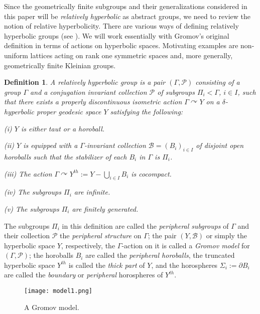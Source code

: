 \documentclass[12pt]{article}
\theoremstyle{boldplain}
\theoremstyle{bolddefinition}
\newtheorem{definition}[equation]{Definition}
\numberwithin{equation}{section}
\def\B{{\mathcal B}}
\def\Ga{\Gamma}
\def\de{\delta}
\def\Si{\Sigma}
\def\acts{\curvearrowright}
\def\D{\partial}
\begin{document}
Since the geometrically finite subgroups and their generalizations considered in this paper 
will be {\em relatively hyperbolic} as abstract groups, we need to review the notion of relative hyperbolicity. 
There are various ways of defining relatively hyperbolic groups 
(see \cite{Osin, Drutu-Sapir, Hruska, Bowditch2012, Farb, Gerasimov-Potyagailo, GerasimovPotyagailo2, Yaman}).
We will work essentially
with Gromov's original definition \cite[\S 8.6]{Gromov}
in terms of actions on hyperbolic spaces.
Motivating examples 
are non-uniform lattices acting on rank one symmetric spaces and, more generally, geometrically finite Kleinian groups. 

\begin{definition}\label{defn:RH}
A {\em relatively hyperbolic group} is a pair $(\Ga, {\mathcal P})$
consisting of a group $\Ga$ and a conjugation invariant collection ${\mathcal P}$ of subgroups $\Pi_i< \Ga$, $i\in I$,
such that there exists a properly discontinuous isometric action $\Ga\acts Y$ 
on a $\de$-hyperbolic proper geodesic space $Y$ 
satisfying the following: 

(i) $Y$ is either taut or a horoball.

(ii) $Y$ is equipped with a $\Ga$-invariant collection $\B=(B_i)_{i\in I}$ of disjoint open horoballs 
such that the stabilizer of each $B_i$ in $\Ga$ is $\Pi_i$.

(iii) The action $\Ga\acts Y^{th}:= Y - \bigcup_{i\in I} B_i$ is cocompact.

(iv) The subgroups $\Pi_i$ are infinite. 

(v) The subgroups $\Pi_i$ are finitely generated.
\end{definition}
The subgroups $\Pi_i$ in this definition are called the {\em peripheral subgroups} of $\Ga$
and their collection ${\mathcal P}$ the {\em peripheral structure} on $\Ga$; 
the pair $(Y,{\mathcal B})$ or simply the hyperbolic space $Y$, respectively, the $\Ga$-action on it
is called a {\em Gromov model} for $(\Ga,{\mathcal P})$; 
the horoballs $B_i$ are called the {\em peripheral horoballs},
the truncated hyperbolic space $Y^{th}$ is called the {\em thick part} of $Y$,
and the horospheres $\Si_i:=\D B_i$ are called the {\em boundary} or {\em peripheral} horospheres of $Y^{th}$. 


\begin{figure}[tbh]
\centering
\texttt{[image: model1.png]}
\caption{A Gromov model.} 
\label{figure1.fig}
\end{figure}
\end{document}
